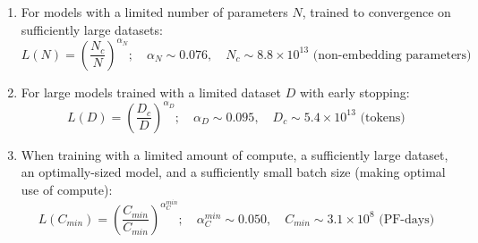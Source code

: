 \documentclass[12pt]{article}
\begin{document}
\begin{enumerate}
    \item For models with a limited number of parameters \(N\), trained to convergence on sufficiently large datasets:
    \[
    L(N) = \left(\frac{N_c}{N}\right)^{\alpha_N}; \quad \alpha_N \sim 0.076, \quad N_c \sim 8.8 \times 10^{13} \text{ (non-embedding parameters)} \tag{1.1}
    \]
    
    \item For large models trained with a limited dataset \(D\) with early stopping:
    \[
    L(D) = \left(\frac{D_c}{D}\right)^{\alpha_D}; \quad \alpha_D \sim 0.095, \quad D_c \sim 5.4 \times 10^{13} \text{ (tokens)} \tag{1.2}
    \]
    
    \item When training with a limited amount of compute, a sufficiently large dataset, an optimally-sized model, and a sufficiently small batch size (making optimal use of compute):
    \[
    L(C_{min}) = \left(\frac{C_{min}}{C_{min}}\right)^{\alpha_C^{min}}; \quad \alpha_C^{min} \sim 0.050, \quad C_{min} \sim 3.1 \times 10^8 \text{ (PF-days)} \tag{1.3}
    \]
\end{enumerate}
\end{document}
